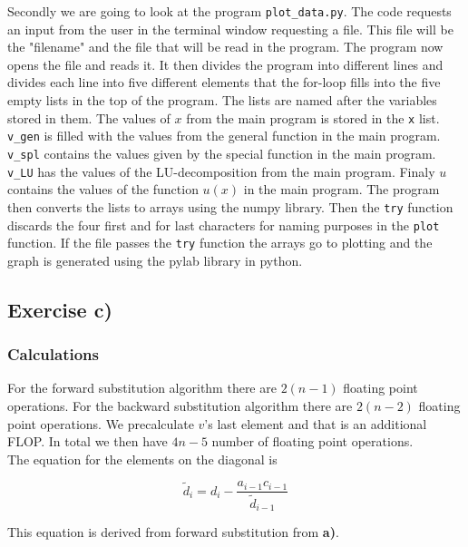 \documentclass{article}
\begin{document}
    Secondly we are going to look at the program \texttt{plot\_data.py}. The code requests an input from the user in the terminal window requesting a file. This file will be the "filename" and the file that will be read in the program. The program now opens the file and reads it. It then divides the program into different lines and divides each line into five different elements that the for-loop fills into the five empty lists in the top of the program. The lists are named after the variables stored in them. The values of $x$ from the main program is stored in the \texttt{x} list. \texttt{v\_gen} is filled with the values from the general function in the main program. \texttt{v\_spl} contains the values given by the special function in the main program. \texttt{v\_LU} has the values of the LU-decomposition from the main program. Finaly $u$ contains the values of the function $u(x)$ in the main program. The program then converts the lists to arrays using the numpy library. Then the \texttt{try} function discards the four first and for last characters for naming purposes in the \texttt{plot} function. If the file passes the \texttt{try} function the arrays go to plotting and the graph is generated using the pylab library in python.


\subsection{Exercise c)} \label{Method c)}

  \subsubsection{Calculations}

    For the forward substitution algorithm there are $2(n-1)$ floating point operations. For the backward substitution algorithm there are $2(n-2)$ floating point operations. We precalculate $v$'s last element and that is an additional FLOP. In total we then have $4n - 5$ number of floating point operations. \\

    The equation for the elements on the diagonal is

    \begin{equation*}
      \tilde{d}_i = d_i - \frac{a_{i-1} c_{i-1}}{\tilde{d}_{i-1}}
    \end{equation*}

    This equation is derived from forward substitution from \textbf{a)}. \\
\end{document}
